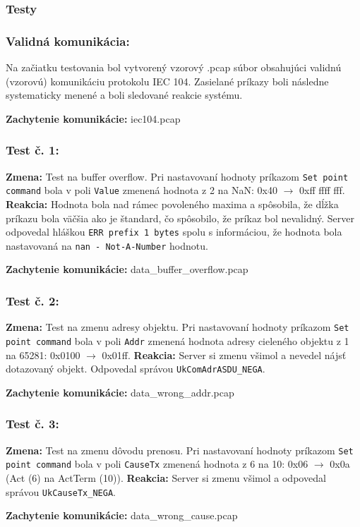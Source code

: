 \subsubsection{Testy}
\subsubsection{Validná komunikácia:} 
Na začiatku testovania bol vytvorený vzorový .pcap súbor obsahujúci validnú (vzorovú) komunikáciu protokolu IEC 104. Zasielané príkazy boli následne systematicky menené a boli sledované reakcie systému. \par
\noindent \textbf{Zachytenie komunikácie:} iec104.pcap
\subsubsection{Test č. 1:}
\textbf{Zmena:} Test na buffer overflow. Pri nastavovaní hodnoty príkazom {\tt Set point command} bola v poli {\tt Value} zmenená hodnota z 2 na NaN: 0x40 $\rightarrow$ 0xff ffff fff. \newline
\textbf{Reakcia:} Hodnota bola nad rámec povoleného maxima a spôsobila, že dĺžka príkazu bola väčšia ako je štandard, čo spôsobilo, že príkaz bol nevalidný. Server odpovedal hláškou {\tt ERR prefix 1 bytes} spolu s informáciou, že hodnota bola nastavovaná na {\tt nan - Not-A-Number} hodnotu. \par
\noindent \textbf{Zachytenie komunikácie:} data\_buffer\_overflow.pcap
\subsubsection{Test č. 2:}
\textbf{Zmena:} Test na zmenu adresy objektu. Pri nastavovaní hodnoty príkazom {\tt Set point command} bola v poli {\tt Addr} zmenená hodnota adresy cieleného objektu z 1 na 65281: 0x0100 $\rightarrow$ 0x01ff. \newline
\textbf{Reakcia:} Server si zmenu všimol a nevedel nájsť dotazovaný objekt. Odpovedal správou {\tt UkComAdrASDU\_NEGA}. \par
\noindent \textbf{Zachytenie komunikácie:} data\_wrong\_addr.pcap
\subsubsection{Test č. 3:}
\textbf{Zmena:} Test na zmenu dôvodu prenosu. Pri nastavovaní hodnoty príkazom {\tt Set point command} bola v poli {\tt CauseTx} zmenená hodnota z 6 na 10: 0x06 $\rightarrow$ 0x0a (Act (6) na ActTerm (10)). \newline
\textbf{Reakcia:} Server si zmenu všimol a odpovedal správou {\tt UkCauseTx\_NEGA}. \par
\noindent \textbf{Zachytenie komunikácie:} data\_wrong\_cause.pcap
